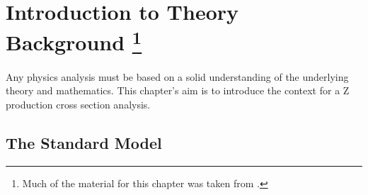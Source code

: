 \chapter[Theory of Z Production]{Introduction to Theory Background \protect\footnote{Much of the material for this chapter was taken from \cite{HM}.}}
\label{theory}

Any physics analysis must be based on a 
solid understanding of the 
underlying theory and mathematics.  
This chapter's aim is to introduce 
the 
context %
for a Z production 
cross section analysis.  


\section{The Standard Model}
\label{theory:SM}




